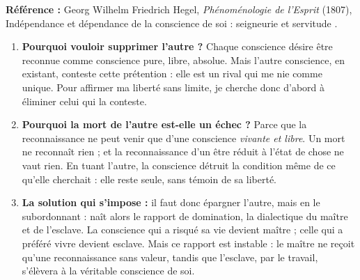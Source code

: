 \documentclass[11pt]{article}
\begin{document}
\begin{corrige}
\textbf{Référence :} Georg Wilhelm Friedrich Hegel, \emph{Phénoménologie de l'Esprit} (1807), \guillemotleft Indépendance et dépendance de la conscience de soi : seigneurie et servitude \guillemotright.
\begin{enumerate}
\item \textbf{Pourquoi vouloir supprimer l'autre ?} Chaque conscience désire être reconnue comme conscience pure, libre, absolue. Mais l'autre conscience, en existant, conteste cette prétention : elle est un rival qui me nie comme unique. Pour affirmer ma liberté sans limite, je cherche donc d'abord à éliminer celui qui la conteste.
\item \textbf{Pourquoi la mort de l'autre est-elle un échec ?} Parce que la reconnaissance ne peut venir que d'une conscience \emph{vivante et libre}. Un mort ne reconnaît rien ; et la reconnaissance d'un être réduit à l'état de chose ne vaut rien. En tuant l'autre, la conscience détruit la condition même de ce qu'elle cherchait : elle reste seule, sans témoin de sa liberté.
\item \textbf{La solution qui s'impose :} il faut donc épargner l'autre, mais en le subordonnant : naît alors le rapport de domination, la dialectique du maître et de l'esclave. La conscience qui a risqué sa vie devient maître ; celle qui a préféré vivre devient esclave. Mais ce rapport est instable : le maître ne reçoit qu'une reconnaissance sans valeur, tandis que l'esclave, par le travail, s'élèvera à la véritable conscience de soi.
\end{enumerate}
\end{corrige}
\end{document}
